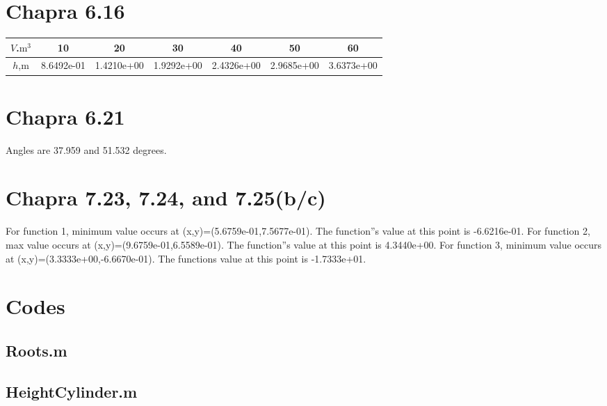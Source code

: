 \documentclass{article}
\begin{document}
\section{Chapra 6.16}
\begin{center}
\begin{tabular}{|c||c|c|c|c|c|c|}
\hline
$V$.$\mathrm{m}^{3}$ & 10 & 20 & 30 & 40 & 50 & 60\\\hline
$h$,m & 8.6492e-01 & 1.4210e+00 & 1.9292e+00 & 2.4326e+00 & 2.9685e+00 & 3.6373e+00\\\hline
\end{tabular}
\end{center}


\section{Chapra 6.21}
Angles are 37.959 and 51.532 degrees.

\section{Chapra 7.23, 7.24, and 7.25(b/c)}
For function 1, minimum value occurs at (x,y)=(5.6759e-01,7.5677e-01). The function''s value at this point is -6.6216e-01.
For function 2, max value occurs at (x,y)=(9.6759e-01,6.5589e-01). The function''s value at this point is 4.3440e+00.
For function 3, minimum value occurs at (x,y)=(3.3333e+00,-6.6670e-01). The functions value at this point is -1.7333e+01.
\pagebreak

\appendix
\section{Codes}


\subsection{Roots.m}


\subsection{HeightCylinder.m}
\end{document}
